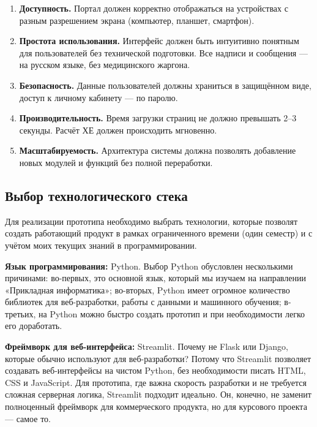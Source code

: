 \documentclass[14pt, a4paper]{extarticle}
\begin{document}
\begin{enumerate}
\item \textbf{Доступность.} Портал должен корректно отображаться на устройствах с разным разрешением экрана (компьютер, планшет, смартфон).

\item \textbf{Простота использования.} Интерфейс должен быть интуитивно понятным для пользователей без технической подготовки. Все надписи и сообщения — на русском языке, без медицинского жаргона.

\item \textbf{Безопасность.} Данные пользователей должны храниться в защищённом виде, доступ к личному кабинету — по паролю.

\item \textbf{Производительность.} Время загрузки страниц не должно превышать 2–3 секунды. Расчёт ХЕ должен происходить мгновенно.

\item \textbf{Масштабируемость.} Архитектура системы должна позволять добавление новых модулей и функций без полной переработки.
\end{enumerate}

\subsection{Выбор технологического стека}

\noindent Для реализации прототипа необходимо выбрать технологии, которые позволят создать работающий продукт в рамках ограниченного времени (один семестр) и с учётом моих текущих знаний в программировании.

\medskip
\noindent \textbf{Язык программирования:} Python. Выбор Python обусловлен несколькими причинами: во-первых, это основной язык, который мы изучаем на направлении «Прикладная информатика»; во-вторых, Python имеет огромное количество библиотек для веб-разработки, работы с данными и машинного обучения; в-третьих, на Python можно быстро создать прототип и при необходимости легко его доработать.

\medskip
\noindent \textbf{Фреймворк для веб-интерфейса:} Streamlit. Почему не Flask или Django, которые обычно используют для веб-разработки? Потому что Streamlit позволяет создавать веб-интерфейсы на чистом Python, без необходимости писать HTML, CSS и JavaScript. Для прототипа, где важна скорость разработки и не требуется сложная серверная логика, Streamlit подходит идеально. Он, конечно, не заменит полноценный фреймворк для коммерческого продукта, но для курсового проекта — самое то.
\end{document}
